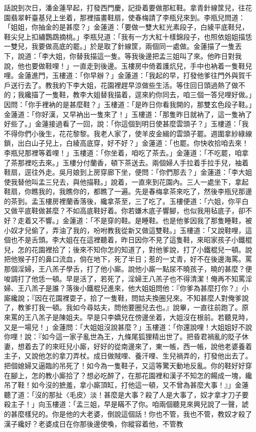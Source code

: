 \begin{showcontents}{}
話說到次日，潘金蓮早起，打發西門慶，記掛着要做那紅鞋。拿青針線筐兒，往花園翡翠軒臺基兒上坐着，那裡描畫鞋扇，使春梅請了李瓶兒來到。李瓶兒問道：「姐姐，你抽金的是甚麼？」金蓮道：「要做一雙大紅光素段子，白綾平底鞋兒，鞋尖兒上扣繡鸚鵡摘桃。」李瓶兒道：「我有一方大紅十樣錦段子，也照依姐姐描恁一雙兒，我要做高底的罷。」於是取了針線筐，兩個同一處做。金蓮描了一隻丟下，說道：「李大姐，你替我描這一隻。等我後邊把孟三姐叫了來。他昨日對我說，他也要做鞋哩！」一直走到後邊。玉樓房中倚着護炕兒，手中也衲着一隻鞋兒哩。金蓮進門，玉樓道：「你早辦？」金蓮道：「我起的早，打發他爹往門外與賀千戶送行去了。教我約下李大姐，花園裡趕早涼做些生活。等住回日頭過熱了做不的；我纔描了一隻鞋，教李大姐替我描着，逕來約你同去，咱三個一答兒哩好做。」因問：「你手裡衲的是甚麼鞋？」玉樓道：「是昨日你看我開的，那雙玄色段子鞋。」金蓮道：「你好漢，又早衲出一隻來了！」玉樓道：「那隻昨日就衲了，這一隻衲了好些了。」金蓮接過看了一回，說：「你這個到明日使甚麼雲頭子？」玉樓道：「我不得你們小後生，花花黎黎。我老人家了，使羊皮金緝的雲頭子罷。週圍拿紗綠線鎖，出白山子兒上，白綾高底穿，好不好？」金蓮道：「也罷。你快收拾咱去來！李瓶兒那裡等着哩！」玉樓道：「你坐着，咱吃了茶去。」金蓮道：「不吃罷，咱拿了茶那裡吃去來。」玉樓分付蘭香，頓下茶送去。兩個婦人手拉着手拉手兒，袖着鞋扇，逕往外走。吳月娘到上房穿廊下坐，便問：「你們那去？」金蓮道：「李大姐使我替他叫孟三兒去，與他描鞋。」說着，一直來到花園內。三人一處坐下，拿起鞋扇，你瞧我的，我瞧你的，都瞧了一遍。先是春梅拿茶來吃了，然後李瓶兒那邊的茶到。孟玉樓房裡蘭香落後，纔拿茶至，三了吃了。玉樓便道：「六姐，你平白又做平底鞋做甚麼？不如高底鞋好着。你若嫌木底子響腳，也似我用毡底子，卻不好？走着又不響。」金蓮道：「不是穿的鞋。是睡鞋。也是他爹因我了那隻睡鞋，被小奴才兒偷了，弄油了我的，吩咐教我從新又做這雙鞋。」玉樓道：「又說鞋哩，這個也不是舌頭。李大姐在在這裡聽着，昨日因你不見了這隻鞋，來昭家孩子小鐵棍兒，怎的花園裡拾了；後來不知你怎的知道了，對他爹說，打了小鐵棍兒一頓。說把他猴子打的鼻口流血，倘在地下，死了半日；惹的一丈青，好不在後邊海罵。罵那個淫婦，王八羔子學舌，打了他小廝。說他小廝一點尿不曉孩子，曉的甚麼？便唆調打了他恁一頓。早是活了，若死了，淫婦王八羔子也不得清潔！俺再不知罵淫婦、王八羔子是誰？落後小鐵棍兒進來，他大姐姐問他：『你爹為甚麼打你？』小廝纔說；『因在花園裡耍子，拾了一隻鞋，問姑夫換圈兒來。不知甚麼人對俺爹說了，教爹打我一頓。我如今尋姑夫，問他要圈兒去也。』說畢，一直往前跑了。原來罵的王八羔子是陳姐夫。早是只李嬌兒在傍邊坐着，大姐沒在根前。若聽見時，又是一場兒！」金蓮問：「大姐姐沒說甚麼？」玉樓道：「你還說哩！大姐姐好不說你哩！說：『如今這一家子亂世為王，九條尾狐狸精出世了。把昏君禍亂的貶子休妻，想着去了的來旺兒小廝，好好的從南邊來了，東一帳，西一帳，說他老婆養着主子，又說他怎的拿刀弄杖。成日做賊哩、養汗哩、生兒禍弄的，打發他出去了。把個媳婦又逼臨的吊死了！如今為一隻鞋子，又這等驚天動地反亂。你的鞋好好穿在腳上，怎的教小廝拾了？想必吃醉了，在那花園裡和漢子不知怎的餳成一塊，纔吊了鞋！如今沒的摭羞，拿小廝頂缸，打他這一頓，又不曾為甚麼大事！』」金蓮聽了道：「沒的那扯〈毛皮〉淡！甚麼是大事？殺了人是大事了，奴才拿才刀子要殺主子！」向玉樓道：「孟三姐，早是瞞不了你。咱兩個聽見來興兒說了一聲，諕的甚麼樣兒的。你是他的大老婆，倒說這個話！你也不管，我也不管，教奴才殺了漢子纔好？老婆成日在你那後邊使喚，你縱容着他，不管教
\end{showcontents}
